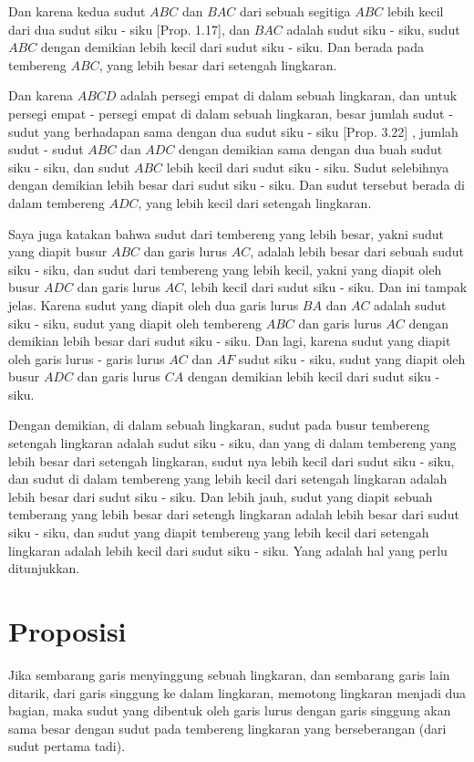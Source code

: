 \documentclass[a4paper]{book}
\begin{document}
Dan karena kedua sudut $ABC$ dan $BAC$ dari sebuah segitiga $ABC$ lebih kecil 
dari dua sudut siku - siku [Prop. 1.17], dan $BAC$ adalah sudut siku - siku, 
sudut $ABC$ dengan demikian lebih kecil dari sudut siku - siku. Dan berada pada
tembereng $ABC$, yang lebih besar dari setengah lingkaran.

Dan karena $ABCD$ adalah persegi empat di dalam sebuah lingkaran, dan untuk
persegi empat - persegi empat di dalam sebuah lingkaran, besar jumlah 
sudut - sudut yang berhadapan sama dengan dua sudut siku - siku [Prop. 3.22]
, jumlah sudut - sudut $ABC$ dan $ADC$ dengan demikian sama dengan dua buah 
sudut siku - siku, dan sudut $ABC$ lebih kecil dari sudut siku - siku. Sudut
selebihnya dengan demikian lebih besar dari sudut siku - siku. Dan sudut
tersebut berada di dalam tembereng $ADC$, yang lebih kecil dari setengah
lingkaran.

Saya juga katakan bahwa sudut dari tembereng yang lebih besar, yakni sudut
yang diapit busur $ABC$ dan garis lurus $AC$, adalah lebih besar dari sebuah
sudut siku - siku, dan sudut dari tembereng yang lebih kecil, yakni yang diapit
oleh busur $ADC$ dan garis lurus $AC$, lebih kecil dari sudut siku - siku.
Dan ini tampak jelas. Karena sudut yang diapit oleh dua garis lurus $BA$ dan
$AC$ adalah sudut siku - siku, sudut yang diapit oleh tembereng $ABC$ dan garis
lurus $AC$ dengan demikian lebih besar dari sudut siku - siku. Dan lagi, karena
sudut yang diapit oleh garis lurus - garis lurus $AC$ dan $AF$ sudut siku - 
siku, sudut yang diapit oleh busur $ADC$ dan garis lurus $CA$ dengan demikian 
lebih kecil dari sudut siku - siku.

Dengan demikian, di dalam sebuah lingkaran, sudut pada busur tembereng setengah 
lingkaran adalah sudut siku - siku, dan yang di dalam tembereng yang lebih 
besar dari setengah lingkaran, sudut nya lebih kecil dari sudut siku - siku,
dan sudut di dalam tembereng yang lebih kecil dari setengah lingkaran adalah
lebih besar dari sudut siku - siku. Dan lebih jauh, sudut yang diapit sebuah 
temberang yang lebih besar dari setengh lingkaran adalah lebih besar dari 
sudut siku - siku, dan sudut yang diapit tembereng yang lebih kecil dari setengah
lingkaran adalah lebih kecil dari sudut siku - siku. Yang adalah hal yang
perlu ditunjukkan.  

\section*{\centering Proposisi \thesection}
Jika sembarang garis menyinggung sebuah lingkaran, dan sembarang garis lain 
ditarik, dari garis singgung ke dalam lingkaran, memotong lingkaran menjadi
dua bagian, maka sudut yang dibentuk oleh garis lurus dengan garis
singgung akan sama besar dengan sudut pada tembereng lingkaran yang 
berseberangan (dari sudut pertama tadi).
\end{document}
